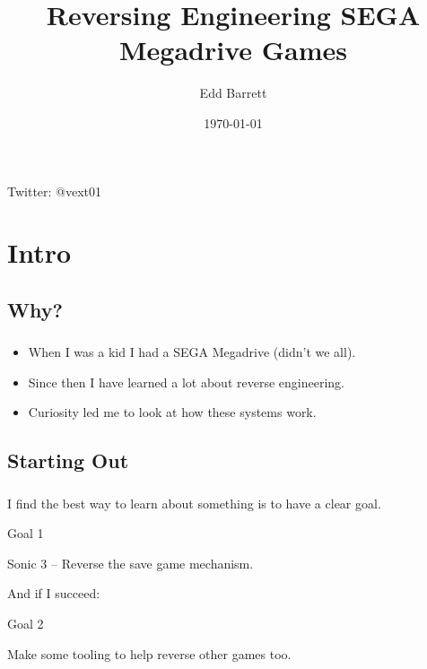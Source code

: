 \documentclass{beamer}
\title{Reversing Engineering SEGA Megadrive Games}
\author{Edd Barrett}
\date{\today}
\begin{document}

\begin{frame}[fragile]
  \titlepage
  \vspace{-4em}
  \begin{center}
  Twitter: @vext01
  \end{center}
\end{frame}


\section{Intro}

\subsection{Why?}

\begin{frame}[fragile]
\frametitle{\insertsubsection}

\begin{itemize} 
\item When I was a kid I had a SEGA Megadrive (didn't we all).
\vfill
\item Since then I have learned a lot about reverse engineering.
\vfill
\item Curiosity led me to look at how these systems work.
\end{itemize}

\end{frame}


\subsection{Starting Out}
\begin{frame}[fragile]
\frametitle{\insertsubsection}

\vfill
I find the best way to learn about something is to have a clear goal.


\begin{block}{Goal 1}
\begin{center}
Sonic 3 -- Reverse the save game mechanism.
\end{center}
\end{block}

\vfill
And if I succeed:

\begin{block}{Goal 2}
\begin{center}
Make some tooling to help reverse other games too.
\end{center}
\end{block}
\end{frame}
\vfill
\end{document}

